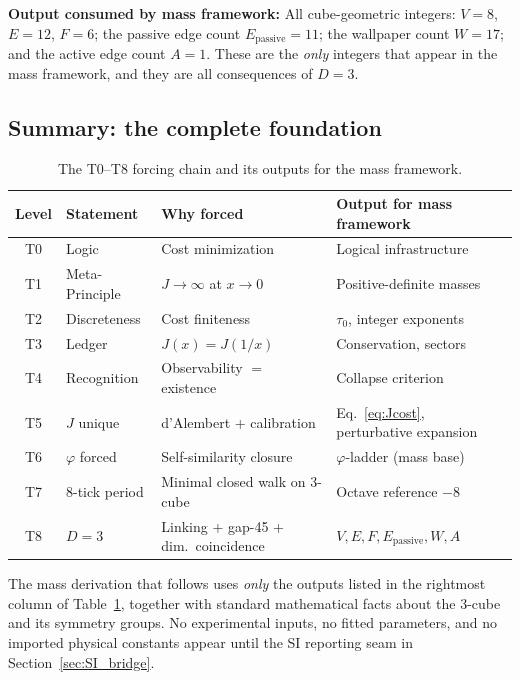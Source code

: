\documentclass[11pt,a4paper]{article}
\theoremstyle{definition}
\theoremstyle{remark}
\newcommand{\phig}{\varphi}
\newcommand{\Jcost}{J}
\newcommand{\Epass}{E_{\mathrm{passive}}}
\begin{document}
\medskip
\noindent\textbf{Output consumed by mass framework:}
All cube-geometric integers: $V = 8$, $E = 12$, $F = 6$; the passive edge
count $\Epass = 11$; the wallpaper count $W = 17$; and the active edge count
$A = 1$.  These are the \emph{only} integers that appear in the mass framework,
and they are all consequences of $D = 3$.


\subsection{Summary: the complete foundation}

\begin{table}[h]
\centering
\caption{The T0--T8 forcing chain and its outputs for the mass framework.}
\label{tab:forcing_chain}
\small
\begin{tabular}{@{}clp{5.8cm}p{4.5cm}@{}}
\toprule
Level & Statement & Why forced & Output for mass framework \\
\midrule
T0 & Logic & Cost minimization & Logical infrastructure \\
T1 & Meta-Principle & $\Jcost \to \infty$ at $x \to 0$ & Positive-definite masses \\
T2 & Discreteness & Cost finiteness & $\tau_0$, integer exponents \\
T3 & Ledger & $\Jcost(x) = \Jcost(1/x)$ & Conservation, sectors \\
T4 & Recognition & Observability $=$ existence & Collapse criterion \\
T5 & $\Jcost$ unique & d'Alembert + calibration & Eq.~\eqref{eq:Jcost}, perturbative expansion \\
T6 & $\phig$ forced & Self-similarity closure & $\phig$-ladder (mass base) \\
T7 & 8-tick period & Minimal closed walk on 3-cube & Octave reference $-8$ \\
T8 & $D = 3$ & Linking + gap-45 + dim.\ coincidence & $V, E, F, \Epass, W, A$ \\
\bottomrule
\end{tabular}
\end{table}

\noindent
The mass derivation that follows uses \emph{only} the outputs listed in the
rightmost column of Table~\ref{tab:forcing_chain}, together with
standard mathematical facts about the 3-cube and its symmetry groups.
No experimental inputs, no fitted parameters, and no imported physical
constants appear until the SI reporting seam in Section~\ref{sec:SI_bridge}.
\end{document}
